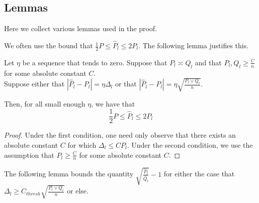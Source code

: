 \documentclass{article}
\begin{document}
\begin{comment}
Similarly, 
\begin{align*}
(K \log K)^2 \gamma \left(\frac{P_l \vee Q_l}{\Delta_l} \right)^2 &= 
   o \left( \frac{ (K \log K)^{r+2} (P_l \vee Q_l)^{r+2}}{ n^r \Delta_l^{2r + 2}} \right) \\
  &\rightarrow 0 \quad \trm{(under assumption~\ref{eqn:weak_rate_assumption2})}
\end{align*}

\end{proof}
\end{comment}





\subsection{Lemmas}

Here we collect various lemmas used in the proof.

We often use the bound that $\frac{1}{2} P \leq \hat{P}_l \leq 2 P_l$. The following lemma justifies this.

\begin{lemma}
\label{lem:bound_ratio_P_Pl}
Let $\eta$ be a sequence that tends to zero. Suppose that $P_l \asymp Q_l$ and that $P_l, Q_l \geq \frac{C}{n}$ for some absolute constant $C$.\\

Suppose either that $|\hat{P}_l - P_l| = \eta \Delta_l$ or that $| \hat{P}_l - P_l | = \eta \sqrt{ \frac{P_l \vee Q_l}{n} }$. 

Then, for all small enough $\eta$, we have that
\[
\frac{1}{2} P \leq \hat{P}_l \leq 2 P_l
\]

\end{lemma}

\begin{proof}
Under the first condition, one need only observe that there exists an absolute constant $C$ for which $\Delta_l \leq C P_l$. Under the second condition, we use the assumption that $P_l \geq \frac{C}{n}$ for some absolute constant $C$. 

\end{proof}

The following lemma bounds the quantity $\sqrt{ \frac{\hat{P}_l}{\hat{Q}_l}} - 1$ for either the case that $\Delta_l \geq C_{thresh} \sqrt{ \frac{P_l \vee Q_l}{n} }$ or else. 
\end{document}
